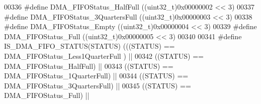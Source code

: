 \begin{DoxyCode}
00336 \textcolor{preprocessor}{#}\textcolor{preprocessor}{define} \textcolor{preprocessor}{DMA\_FIFOStatus\_HalfFull}           \textcolor{preprocessor}{(}\textcolor{preprocessor}{(}\textcolor{preprocessor}{uint32\_t}\textcolor{preprocessor}{)}0x00000002 \textcolor{preprocessor}{<<} 3\textcolor{preprocessor}{)}
00337 \textcolor{preprocessor}{#}\textcolor{preprocessor}{define} \textcolor{preprocessor}{DMA\_FIFOStatus\_3QuartersFull}      \textcolor{preprocessor}{(}\textcolor{preprocessor}{(}\textcolor{preprocessor}{uint32\_t}\textcolor{preprocessor}{)}0x00000003 \textcolor{preprocessor}{<<} 3\textcolor{preprocessor}{)}
00338 \textcolor{preprocessor}{#}\textcolor{preprocessor}{define} \textcolor{preprocessor}{DMA\_FIFOStatus\_Empty}              \textcolor{preprocessor}{(}\textcolor{preprocessor}{(}\textcolor{preprocessor}{uint32\_t}\textcolor{preprocessor}{)}0x00000004 \textcolor{preprocessor}{<<} 3\textcolor{preprocessor}{)}
00339 \textcolor{preprocessor}{#}\textcolor{preprocessor}{define} \textcolor{preprocessor}{DMA\_FIFOStatus\_Full}               \textcolor{preprocessor}{(}\textcolor{preprocessor}{(}\textcolor{preprocessor}{uint32\_t}\textcolor{preprocessor}{)}0x00000005 \textcolor{preprocessor}{<<} 3\textcolor{preprocessor}{)}
00340 
00341 \textcolor{preprocessor}{#}\textcolor{preprocessor}{define} \textcolor{preprocessor}{IS\_DMA\_FIFO\_STATUS}\textcolor{preprocessor}{(}\textcolor{preprocessor}{STATUS}\textcolor{preprocessor}{)} \textcolor{preprocessor}{(}\textcolor{preprocessor}{(}\textcolor{preprocessor}{(}\textcolor{preprocessor}{STATUS}\textcolor{preprocessor}{)} \textcolor{preprocessor}{==} 
      DMA_FIFOStatus_Less1QuarterFull \textcolor{preprocessor}{)} \textcolor{preprocessor}{||}
00342                                     \textcolor{preprocessor}{(}\textcolor{preprocessor}{(}\textcolor{preprocessor}{STATUS}\textcolor{preprocessor}{)} \textcolor{preprocessor}{==} DMA_FIFOStatus_HalfFull\textcolor{preprocessor}{)}          \textcolor{preprocessor}{||}
00343                                     \textcolor{preprocessor}{(}\textcolor{preprocessor}{(}\textcolor{preprocessor}{STATUS}\textcolor{preprocessor}{)} \textcolor{preprocessor}{==} 
      DMA_FIFOStatus_1QuarterFull\textcolor{preprocessor}{)}      \textcolor{preprocessor}{||}
00344                                     \textcolor{preprocessor}{(}\textcolor{preprocessor}{(}\textcolor{preprocessor}{STATUS}\textcolor{preprocessor}{)} \textcolor{preprocessor}{==} 
      DMA_FIFOStatus_3QuartersFull\textcolor{preprocessor}{)}     \textcolor{preprocessor}{||}
00345                                     \textcolor{preprocessor}{(}\textcolor{preprocessor}{(}\textcolor{preprocessor}{STATUS}\textcolor{preprocessor}{)} \textcolor{preprocessor}{==} DMA_FIFOStatus_Full\textcolor{preprocessor}{)}              \textcolor{preprocessor}{||}

\end{DoxyCode}
